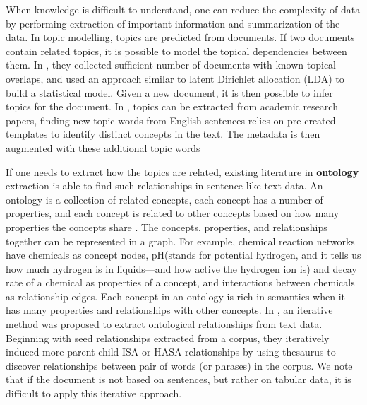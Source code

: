 When knowledge is difficult to understand, one can reduce the complexity of data by performing extraction of important information and summarization of the data. In topic modelling, topics are predicted from documents. If two documents contain related topics, it is possible to model the topical dependencies between them. In \cite{Zolaktaf2012Modeling}, they collected sufficient number of documents with known topical overlaps, and used an approach similar to latent Dirichlet allocation (LDA) to build a statistical model. Given a new document, it is then possible to infer topics for the document. In \cite{Nargesian2018Table}, topics can be extracted from academic research papers, finding new topic words from English sentences relies on pre-created templates to identify distinct concepts in the text. The metadata is then augmented with these additional topic words

If one needs to extract how the topics are related, existing literature in \textbf{\gls{ontology}} extraction is able to find such relationships in sentence-like text data. An ontology is a collection of related concepts, each concept has a number of properties, and each concept is related to other concepts based on how many properties the concepts share \cite{cruz2005role}. The concepts, properties, and relationships together can be represented in a graph. For example, chemical reaction networks have chemicals as concept nodes, pH(stands for potential hydrogen, and it tells us how much hydrogen is in liquids—and how active the hydrogen ion is) and decay rate of a chemical as properties of a concept, and interactions between chemicals as relationship edges. Each concept in an ontology is rich in semantics when it has many properties and relationships with other concepts. In \cite{10.1145/2396761.2398468}, an iterative method was proposed to extract ontological relationships from text data. Beginning with seed relationships extracted from a corpus, they iteratively induced more parent-child ISA or HASA relationships by using thesaurus to discover relationships between pair of words (or phrases) in the corpus. We note that if the document is not based on sentences, but rather on tabular data, it is difficult to apply this iterative approach.


